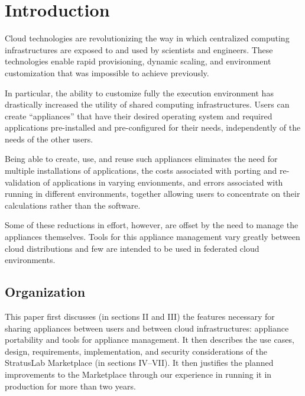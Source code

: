 \section{Introduction}
\label{sec:Introduction}

Cloud technologies are revolutionizing the way in which centralized
computing infrastructures are exposed to and used by scientists and
engineers.  These technologies enable rapid provisioning, dynamic
scaling, and environment customization that was impossible to achieve
previously. 

In particular, the ability to customize fully the execution
environment has drastically increased the utility of shared computing
infrastructures.  Users can create ``appliances'' that have their
desired operating system and required applications pre-installed
and pre-configured for their needs, independently of the needs of the
other users.

Being able to create, use, and reuse such appliances eliminates the
need for multiple installations of applications, the costs associated
with porting and re-validation of applications in varying envionments,
and errors associated with running in different environments, together
allowing users to concentrate on their calculations rather than the
software.

Some of these reductions in effort, however, are offset by the need to
manage the appliances themselves.  Tools for this appliance management
vary greatly between cloud distributions and few are intended to be
used in federated cloud environments.

\subsection{Organization}

This paper first discusses (in sections II and III) the features
necessary for sharing appliances between users and between cloud
infrastructures: appliance portability and tools for appliance
management.  It then describes the use cases, design, requirements,
implementation, and security considerations of the StratusLab
Marketplace (in sections IV--VII).  It then justifies the planned
improvements to the Marketplace through our experience in running it
in production for more than two years.
